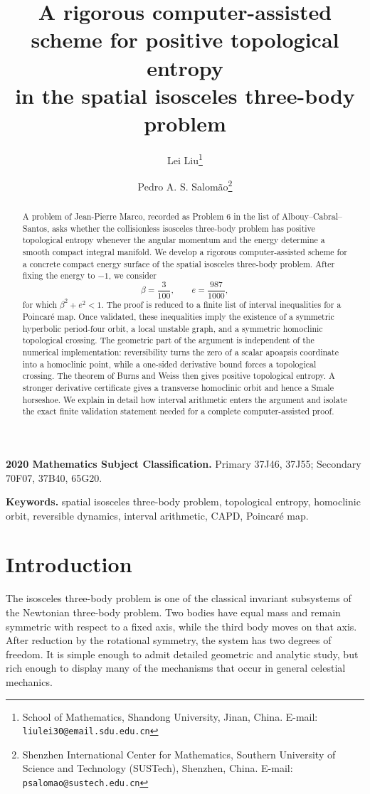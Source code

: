 \documentclass[11pt]{article}
\title{\bf A rigorous computer-assisted scheme for positive topological entropy\\
in the spatial isosceles three-body problem}
\author{
Lei Liu\thanks{School of Mathematics, Shandong University, Jinan, China.
E-mail: \texttt{liulei30@email.sdu.edu.cn}}
\and
Pedro A. S. Salom\~ao\thanks{Shenzhen International Center for Mathematics,
Southern University of Science and Technology (SUSTech), Shenzhen, China.
E-mail: \texttt{psalomao@sustech.edu.cn}}
}
\date{}
\begin{document}
\maketitle

\begin{abstract}
A problem of Jean-Pierre Marco, recorded as Problem 6 in the list of
Albouy--Cabral--Santos, asks whether the collisionless isosceles three-body
problem has positive topological entropy whenever the angular momentum and
the energy determine a smooth compact integral manifold.
We develop a rigorous computer-assisted scheme for a concrete compact energy
surface of the spatial isosceles three-body problem.  After fixing the energy
to $-1$, we consider
\[
 \beta=\frac{3}{100},\qquad e=\frac{987}{1000},
\]
for which $\beta^2+e^2<1$.
The proof is reduced to a finite list of interval inequalities for a
Poincar\'e map.  Once validated, these inequalities imply the existence of a
symmetric hyperbolic period-four orbit, a local unstable graph, and a
symmetric homoclinic topological crossing.  The geometric part of the argument is independent of
the numerical implementation: reversibility turns the zero of a scalar
apoapsis coordinate into a homoclinic point, while a one-sided derivative
bound forces a topological crossing.  The theorem of Burns and Weiss then
gives positive topological entropy.  A stronger derivative certificate gives
a transverse homoclinic orbit and hence a Smale horseshoe.
We explain in detail how interval arithmetic enters the argument and isolate
the exact finite validation statement needed for a complete
computer-assisted proof.
\end{abstract}

\medskip
\noindent
\textbf{2020 Mathematics Subject Classification.}
Primary 37J46, 37J55; Secondary 70F07, 37B40, 65G20.

\medskip
\noindent
\textbf{Keywords.}
spatial isosceles three-body problem, topological entropy, homoclinic orbit,
reversible dynamics, interval arithmetic, CAPD, Poincar\'e map.

\section{Introduction}

The isosceles three-body problem is one of the classical invariant
subsystems of the Newtonian three-body problem.  Two bodies have equal mass
and remain symmetric with respect to a fixed axis, while the third body moves
on that axis.  After reduction by the rotational symmetry, the system has two
degrees of freedom.  It is simple enough to admit detailed geometric and
analytic study, but rich enough to display many of the mechanisms that occur
in general celestial mechanics.
\end{document}
